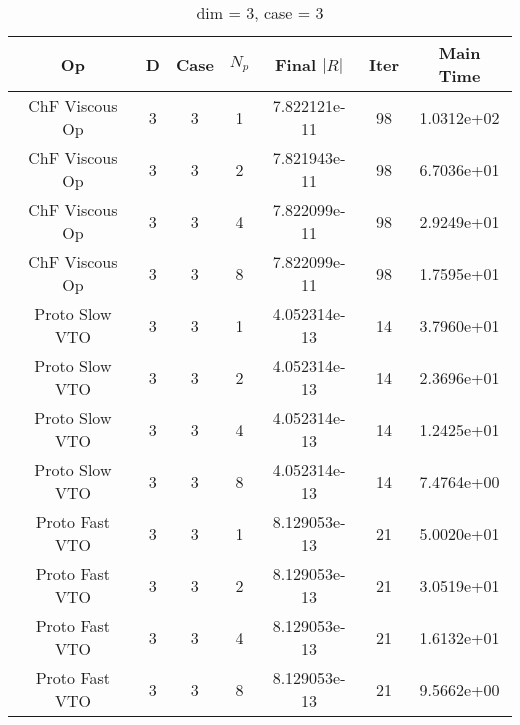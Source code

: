 \documentclass{article}
\begin{document}
\begin{small} 
  \begin{table} [p]
    \begin{center}
      \begin{tabular}{|c|c|c|c|c|c||c|} \hline
        Op & D & Case & $N_p$ & Final $|R|$  &  Iter & Main Time \\
        \hline

        ChF Viscous Op & 3 & 3 & 1& 7.822121e-11 & 98 & 1.0312e+02\\
        ChF Viscous Op & 3 & 3 & 2& 7.821943e-11 & 98 & 6.7036e+01\\
        ChF Viscous Op & 3 & 3 & 4& 7.822099e-11 & 98 & 2.9249e+01\\
        ChF Viscous Op & 3 & 3 & 8& 7.822099e-11 & 98 & 1.7595e+01\\
        Proto Slow VTO & 3 & 3 & 1& 4.052314e-13 & 14 & 3.7960e+01\\
        Proto Slow VTO & 3 & 3 & 2& 4.052314e-13 & 14 & 2.3696e+01\\
        Proto Slow VTO & 3 & 3 & 4& 4.052314e-13 & 14 & 1.2425e+01\\
        Proto Slow VTO & 3 & 3 & 8& 4.052314e-13 & 14 & 7.4764e+00\\
        Proto Fast VTO & 3 & 3 & 1& 8.129053e-13 & 21 & 5.0020e+01\\
        Proto Fast VTO & 3 & 3 & 2& 8.129053e-13 & 21 & 3.0519e+01\\
        Proto Fast VTO & 3 & 3 & 4& 8.129053e-13 & 21 & 1.6132e+01\\
        Proto Fast VTO & 3 & 3 & 8& 8.129053e-13 & 21 & 9.5662e+00\\

        \hline
      \end{tabular} 
    \end{center}   
    \label{__dim_=_3__case_=_3} 
    \caption{dim = 3, case = 3} 
  \end{table} 
\end{small}
\end{document}
